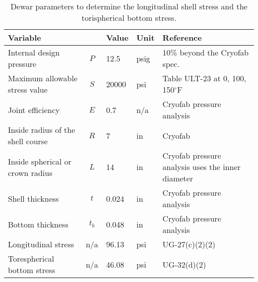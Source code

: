 \begin{table}[h]
\begin{center}
\tabcolsep=10pt
\begin{tabular}{>{\raggedleft}m{4.5cm}|c|l|l|m{5.5cm}}
\hline
\hline
Variable &  & Value & Unit & Reference \\
\hline
Internal design pressure & $P$ & 12.5 & psig & 10\% beyond the Cryofab spec. \\
Maximum allowable stress value & $S$ & 20000 & psi & Table ULT-23 at 0, 100, 150$^{\circ}$F \\
Joint efficiency & $E$ & 0.7 & n/a & Cryofab pressure analysis \\
Inside radius of the shell course & $R$ & 7 & in & Cryofab \\
Inside spherical or crown radius & $L$ & 14 & in & Cryofab pressure analysis uses 
the inner diameter \\
Shell thickness & $t$ & 0.024 & in & Cryofab pressure analysis \\
Bottom thickness & $t_b$ & 0.048 & in & Cryofab pressure analysis \\
\hline
Longitudinal stress & n/a & 96.13 & psi &  UG-27(c)(2)(2) \\
Torespherical bottom stress & n/a & 46.08 & psi & UG-32(d)(2) \\
\hline
\hline
\end{tabular}
\caption{Dewar parameters to determine the longitudinal shell stress
and the torispherical bottom stress.}
\label{table:dewar}
\end{center}
\end{table}
